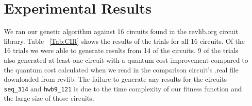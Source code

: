 \section{Experimental Results}

We ran our genetic algorithm against 16 circuits found in the revlib.org circuit library. Table ~\ref{Tab:CIR} shows the results of the trials 
for all 16 circuits. Of the 16 trials we were able to generate results from 14 of the circuits. 9 of the trials also generated 
at least one circuit with a quantum cost improvement compared to the quantum cost calculated when we read in the comparison 
circuit's .real file downloaded from revlib. The failure to generate any results for the circuits \verb!seq_314! and
 \verb!hwb9_121! is due to the time complexity of our fitness function and the large size of those circuits. 

